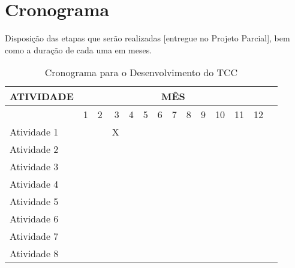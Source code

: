 \section{Cronograma}
Disposição das etapas que serão realizadas [entregue no Projeto Parcial], bem como a duração de cada uma em meses. 

\begin{table}[!htp]\centering
\caption{Cronograma para o Desenvolvimento do TCC}\label{tab: }
\scriptsize
\begin{tabular}{lr|r|r|r|r|r|r|r|r|r|r|rr}\toprule
\multirow{1}{*}{\textbf{ATIVIDADE}} &\multicolumn{12}{c}{\textbf{MÊS}} \\\midrule
&1 &2 &3 &4 &5 &6 &7 &8 &9 &10 &11 &12 \\
Atividade 1 & & & X & & & & & & & \\
Atividade 2 & & & & & & & & & & & \\
Atividade 3 & & & & & & & & & & & \\
Atividade 4 & & & & & & & & & & & \\
Atividade 5 & & & & & & & & & & & \\
Atividade 6 & & & & & & & & & & & \\
Atividade 7 & & & & & & & & & & & \\
Atividade 8 & & & & & & & & & & & \\
\bottomrule
\end{tabular}
\end{table}